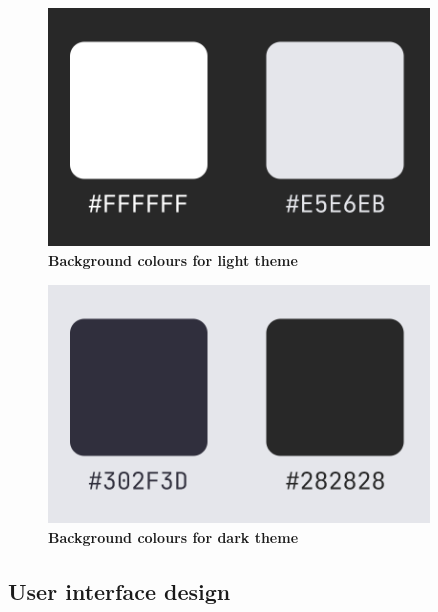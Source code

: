 \begin{figure}[!htb]
\centering
\includegraphics[width=0.9\textwidth]{../Images/UI/BackgroundLight.png}
\caption{\label{fig:dbapiuser}\textbf{Background colours for light theme}}
\end{figure} 

\begin{figure}[!htb]
\centering
\includegraphics[width=0.9\textwidth]{../Images/UI/BackgroundDark.png}
\caption{\label{fig:dbapiuser}\textbf{Background colours for dark theme}}
\end{figure} 
\newpage

\subsection{User interface design}

